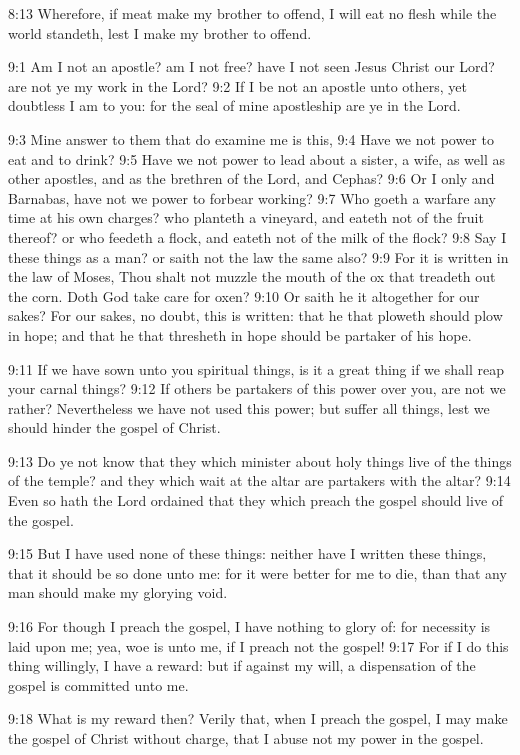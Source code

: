 8:13 Wherefore, if meat make my brother to offend, I will eat no flesh while the world standeth, lest I make my brother to offend.

9:1 Am I not an apostle? am I not free? have I not seen Jesus Christ our Lord? are not ye my work in the Lord?  9:2 If I be not an apostle unto others, yet doubtless I am to you: for the seal of mine apostleship are ye in the Lord.

9:3 Mine answer to them that do examine me is this, 9:4 Have we not power to eat and to drink?  9:5 Have we not power to lead about a sister, a wife, as well as other apostles, and as the brethren of the Lord, and Cephas?  9:6 Or I only and Barnabas, have not we power to forbear working?  9:7 Who goeth a warfare any time at his own charges?  who planteth a vineyard, and eateth not of the fruit thereof? or who feedeth a flock, and eateth not of the milk of the flock?  9:8 Say I these things as a man? or saith not the law the same also?  9:9 For it is written in the law of Moses, Thou shalt not muzzle the mouth of the ox that treadeth out the corn. Doth God take care for oxen?  9:10 Or saith he it altogether for our sakes? For our sakes, no doubt, this is written: that he that ploweth should plow in hope; and that he that thresheth in hope should be partaker of his hope.

9:11 If we have sown unto you spiritual things, is it a great thing if we shall reap your carnal things?  9:12 If others be partakers of this power over you, are not we rather?  Nevertheless we have not used this power; but suffer all things, lest we should hinder the gospel of Christ.

9:13 Do ye not know that they which minister about holy things live of the things of the temple? and they which wait at the altar are partakers with the altar?  9:14 Even so hath the Lord ordained that they which preach the gospel should live of the gospel.

9:15 But I have used none of these things: neither have I written these things, that it should be so done unto me: for it were better for me to die, than that any man should make my glorying void.

9:16 For though I preach the gospel, I have nothing to glory of: for necessity is laid upon me; yea, woe is unto me, if I preach not the gospel!  9:17 For if I do this thing willingly, I have a reward: but if against my will, a dispensation of the gospel is committed unto me.

9:18 What is my reward then? Verily that, when I preach the gospel, I may make the gospel of Christ without charge, that I abuse not my power in the gospel.

